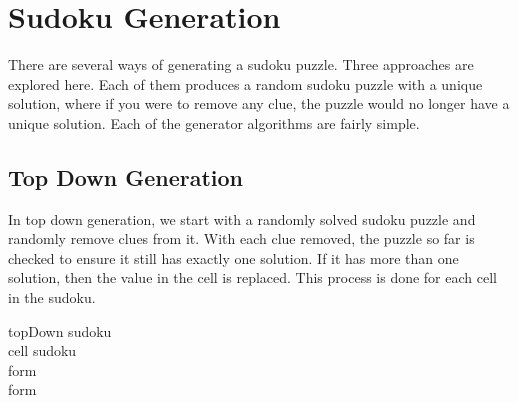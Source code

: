 
\section{Sudoku Generation}

There are several ways of generating a sudoku puzzle. Three approaches are explored here. Each of them produces a random
sudoku puzzle with a unique solution, where if you were to remove any clue, the puzzle would no longer have a unique solution.
Each of the generator algorithms are fairly simple.

\subsection{Top Down Generation}
In top down generation, we start with a randomly solved sudoku puzzle and randomly remove clues from it. With each clue removed,
the puzzle so far is checked to ensure it still has exactly one solution. If it has more than one solution, then the value in the
cell is replaced. This process is done for each cell in the sudoku.
\begin{center}
\begin{pseudocode}[framebox]{topDown}{ }
    sudoku \GETS {}      \\
    \FOR cell \in sudoku \DO \BEGIN
                  \\
        form \GETS {}         \\
        \IF form \neq {} \THEN
    \END                                            \\
    \label{algo:topdown}
\end{pseudocode}
\end{center}

